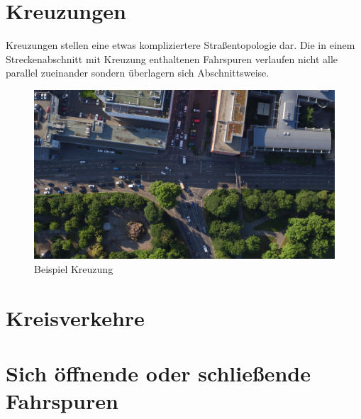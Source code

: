 \section{Kreuzungen}


Kreuzungen stellen eine etwas kompliziertere Straßentopologie dar. Die in einem Streckenabschnitt mit
Kreuzung enthaltenen Fahrspuren verlaufen nicht alle parallel zueinander sondern überlagern sich
Abschnittsweise.

\begin{figure}[H]
\centering
    \includegraphics[width=0.5\linewidth]{resources/img/umsetzung/U1/Neckartor_Aufnahme}
\caption{Beispiel Kreuzung}
\label{fig:topos_crossroad}
\end{figure}

\section{Kreisverkehre}


\section{Sich öffnende oder schließende Fahrspuren}